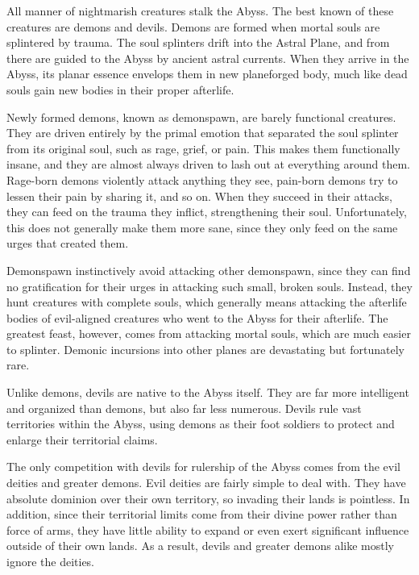                 All manner of nightmarish creatures stalk the Abyss.
                The best known of these creatures are demons and devils.
                Demons are formed when mortal souls are splintered by trauma.
                The soul splinters drift into the Astral Plane, and from there are guided to the Abyss by ancient astral currents.
                When they arrive in the Abyss, its planar essence envelops them in new planeforged body, much like dead souls gain new bodies in their proper afterlife.

                Newly formed demons, known as demonspawn, are barely functional creatures.
                They are driven entirely by the primal emotion that separated the soul splinter from its original soul, such as rage, grief, or pain.
                This makes them functionally insane, and they are almost always driven to lash out at everything around them.
                Rage-born demons violently attack anything they see, pain-born demons try to lessen their pain by sharing it, and so on.
                When they succeed in their attacks, they can feed on the trauma they inflict, strengthening their soul.
                Unfortunately, this does not generally make them more sane, since they only feed on the same urges that created them.

                Demonspawn instinctively avoid attacking other demonspawn, since they can find no gratification for their urges in attacking such small, broken souls.
                Instead, they hunt creatures with complete souls, which generally means attacking the afterlife bodies of evil-aligned creatures who went to the Abyss for their afterlife.
                The greatest feast, however, comes from attacking mortal souls, which are much easier to splinter.
                Demonic incursions into other planes are devastating but fortunately rare.

                Unlike demons, devils are native to the Abyss itself.
                They are far more intelligent and organized than demons, but also far less numerous.
                Devils rule vast territories within the Abyss, using demons as their foot soldiers to protect and enlarge their territorial claims.

                The only competition with devils for rulership of the Abyss comes from the evil deities and greater demons.
                Evil deities are fairly simple to deal with.
                They have absolute dominion over their own territory, so invading their lands is pointless.
                In addition, since their territorial limits come from their divine power rather than force of arms, they have little ability to expand or even exert significant influence outside of their own lands.
                As a result, devils and greater demons alike mostly ignore the deities.

